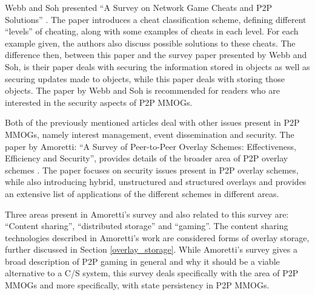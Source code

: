 \documentclass[10pt,a4paper,journal,cspaper,compsoc]{IEEEtran}
\begin{document}
Webb and Soh presented ``A Survey on Network Game Cheats and P2P Solutions'' \cite{survey_p2p_game_cheats}. The paper introduces a cheat
classification scheme, defining different ``levels'' of cheating, along with some examples of cheats in each level. For each example given, the
authors also discuss possible solutions to these cheats. The difference then, between this paper and the survey paper presented by Webb and Soh, is
their paper deals with securing the information stored in objects as well as securing updates made to objects, while this paper deals with storing
those objects. The paper by Webb and Soh is recommended for readers who are interested in the security aspects of P2P MMOGs.

Both of the previously mentioned articles deal with other issues present in P2P MMOGs, namely interest management, event dissemination and security.
The paper by Amoretti: ``A Survey of Peer-to-Peer Overlay Schemes: Effectiveness, Efficiency and Security'', provides details of the broader area of
P2P overlay schemes \cite{amoretti_p2p_overlay_schemes_survey}. The paper focuses on security issues present in P2P overlay schemes, while also
introducing hybrid, unstructured and structured overlays and provides an extensive list of applications of the different schemes in different areas.

Three areas present in Amoretti's survey and also related to this survey are: ``Content sharing'', ``distributed storage'' and ``gaming''. The
content sharing technologies described in Amoretti's work are considered forms of overlay storage, further discussed in Section
\ref{overlay_storage}. While Amoretti's survey gives a broad description of P2P gaming in general and why it should be a viable alternative to a C/S
system, this survey deals specifically with the area of P2P MMOGs and more specifically, with state persistency in P2P MMOGs.

%
\end{document}
